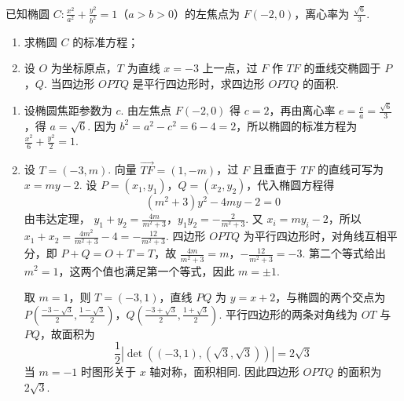 \begin{problem}
已知椭圆 \(C: \frac{x^2}{a^2} + \frac{y^2}{b^2} = 1\)（\(a > b > 0\)）的左焦点为 \(F(-2,0)\)，离心率为 \(\frac{\sqrt{6}}{3}\).

\begin{enumerate}
\item 求椭圆 \(C\) 的标准方程；
\item 设 \(O\) 为坐标原点，\(T\) 为直线 \(x = -3\) 上一点，过 \(F\) 作 \(TF\) 的垂线交椭圆于 \(P\)，\(Q\). 当四边形 \(OPTQ\) 是平行四边形时，求四边形 \(OPTQ\) 的面积.
\end{enumerate}

\begin{solution}
\begin{enumerate}
\item 设椭圆焦距参数为 \(c\). 由左焦点 \(F(-2,0)\) 得 \(c=2\)，再由离心率 \(e=\frac ca=\frac{\sqrt6}{3}\)，得 \(a=\sqrt6\). 因为 \(b^2=a^2-c^2=6-4=2\)，所以椭圆的标准方程为 \(\frac{x^2}{6}+\frac{y^2}{2}=1\).
\item 设 \(T=(-3,m)\). 向量 \(\overrightarrow{TF}=(1,-m)\)，过 \(F\) 且垂直于 \(TF\) 的直线可写为 \(x=my-2\). 设 \(P=(x_1,y_1)\)，\(Q=(x_2,y_2)\)，代入椭圆方程得
\[
(m^2+3)y^2-4my-2=0
\]
由韦达定理，
\(y_1+y_2=\frac{4m}{m^2+3}\)，\(y_1y_2=-\frac2{m^2+3}\).
又 \(x_i=my_i-2\)，所以 \(x_1+x_2=\frac{4m^2}{m^2+3}-4=-\frac{12}{m^2+3}\). 四边形 \(OPTQ\) 为平行四边形时，对角线互相平分，即 \(P+Q=O+T=T\)，故
\(\frac{4m}{m^2+3}=m\)，\(-\frac{12}{m^2+3}=-3\).
第二个等式给出 \(m^2=1\)，这两个值也满足第一个等式，因此 \(m=\pm1\).

取 \(m=1\)，则 \(T=(-3,1)\)，直线 \(PQ\) 为 \(y=x+2\)，与椭圆的两个交点为
\(P\left(\frac{-3-\sqrt3}{2},\frac{1-\sqrt3}{2}\right)\)，\(Q\left(\frac{-3+\sqrt3}{2},\frac{1+\sqrt3}{2}\right)\).
平行四边形的两条对角线为 \(OT\) 与 \(PQ\)，故面积为
\[
\frac12\left|\det\left((-3,1),(\sqrt3,\sqrt3)\right)\right|=2\sqrt3
\]
当 \(m=-1\) 时图形关于 \(x\) 轴对称，面积相同. 因此四边形 \(OPTQ\) 的面积为 \(2\sqrt3\).
\end{enumerate}
\end{solution}
\end{problem}

